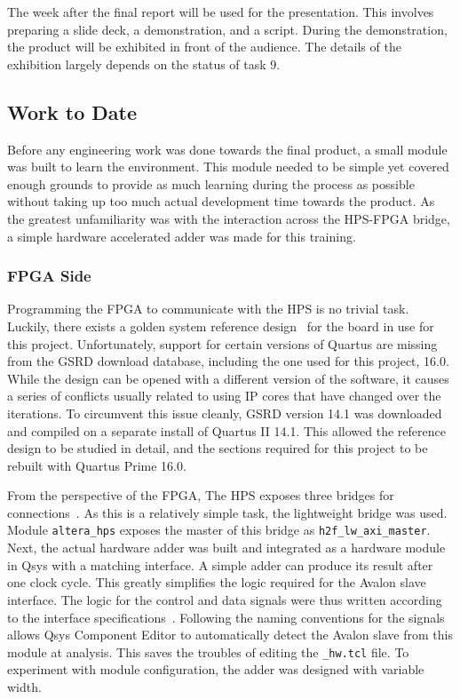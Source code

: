 The week after the final report will be used for the presentation.
This involves preparing a slide deck, a demonstration, and a script.
During the demonstration, the product will be exhibited in front of the
audience.
The details of the exhibition largely depends on the status of task 9.

\subsection{Work to Date}

Before any engineering work was done towards the final product, a small module
was built to learn the environment.
This module needed to be simple yet covered enough grounds to provide as much
learning during the process as possible without taking up too much actual
development time towards the product.
As the greatest unfamiliarity was with the interaction across the HPS-FPGA
bridge, a simple hardware accelerated adder was made for this training.

\subsubsection{\textbf{FPGA Side}}
Programming the FPGA to communicate with the HPS is no trivial task.
Luckily, there exists a golden system reference design~\cite{Rocket1} for
the board in use for this project.
Unfortunately, support for certain versions of Quartus are missing from
the GSRD download database, including the one used for this project, 16.0.
While the design can be opened with a different version of the software,
it causes a series of conflicts usually related to using IP cores that
have changed over the iterations.
To circumvent this issue cleanly, GSRD version 14.1 was downloaded and compiled
on a separate install of Quartus II 14.1.
This allowed the reference design to be studied in detail, and the sections
required for this project to be rebuilt with Quartus Prime 16.0.

From the perspective of the FPGA, The HPS exposes three bridges for
connections~\cite{Altera6}.
As this is a relatively simple task, the lightweight bridge was used.
Module \texttt{altera\_hps} exposes the master of this bridge as
\texttt{h2f\_lw\_axi\_master}.
Next, the actual hardware adder was built and integrated as a hardware
module in Qsys with a matching interface.
A simple adder can produce its result after one clock cycle.
This greatly simplifies the logic required for the Avalon slave interface.
The logic for the control and data signals were thus written according to the
interface specifications~\cite{Intel3}.
Following the naming conventions for the signals allows Qsys Component Editor
to automatically detect the Avalon slave from this module at analysis.
This saves the troubles of editing the \texttt{\_hw.tcl} file.
To experiment with module configuration, the adder was designed with variable
width.

